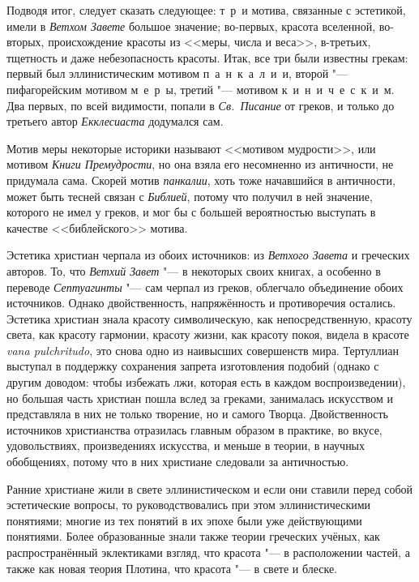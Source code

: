 Подводя итог, следует сказать следующее: т~р~и мотива, связанные с эстетикой, имели в \emph{Ветхом Завете} большое значение; во-первых, красота вселенной, во-вторых, происхождение красоты из <<меры, числа и веса>>, в-третьих, тщетность и даже небезопасность красоты. Итак, все три были известны грекам: первый был эллинистическим мотивом п~а~н~к~а~л~и~и, второй "--- пифагорейским мотивом м~е~р~ы, третий "--- мотивом к~и~н~и~ч~е~с~к~и~м. Два первых, по всей видимости, попали в \emph{Св.~Писание} от греков, и только до третьего автор \emph{Екклесиаста} додумался сам.

Мотив меры некоторые историки называют <<мотивом мудрости>>, или мотивом \emph{Книги Премудрости}, но она взяла его несомненно из античности, не придумала сама. Скорей мотив \emph{панкалии}, хоть тоже начавшийся в античности, может быть тесней связан с \emph{Библией}, потому что получил в ней значение, которого не имел у греков, и мог бы с большей вероятностью  выступать в качестве <<библейского>> мотива.

Эстетика христиан черпала из обоих источников: из \emph{Ветхого Завета} и греческих авторов. То, что \emph{Ветхий Завет} "--- в некоторых своих книгах, а особенно в переводе \emph{Септуагинты} "--- сам черпал из греков, облегчало объединение обоих источников. Однако двойственность, напряжённость и противоречия остались. Эстетика христиан знала красоту символическую, как непосредственную, красоту света, как красоту гармонии, красоту жизни, как красоту покоя, видела в красоте {\sl vana pulchritudo}, это снова одно из наивысших совершенств мира. Тертуллиан выступал в поддержку сохранения запрета изготовления подобий (однако с другим доводом: чтобы избежать лжи, которая есть в каждом воспроизведении), но большая часть христиан пошла вслед за греками, занималась искусством и представляла в них не только творение, но и самого Творца. Двойственность источников христианства отразилась главным образом в практике, во вкусе, удовольствиях, произведениях искусства, и меньше в теории, в научных обобщениях, потому что в них христиане следовали за античностью.

Ранние христиане жили в свете эллинистическом и если они ставили перед собой эстетические вопросы, то руководствовались при этом эллинистическими понятиями; многие из тех понятий в их эпохе были уже действующими понятиями. Более образованные знали также теории греческих учёных, как распространённый эклектиками взгляд, что красота "--- в расположении частей, а также как новая теория Плотина, что красота "--- в свете и блеске.

